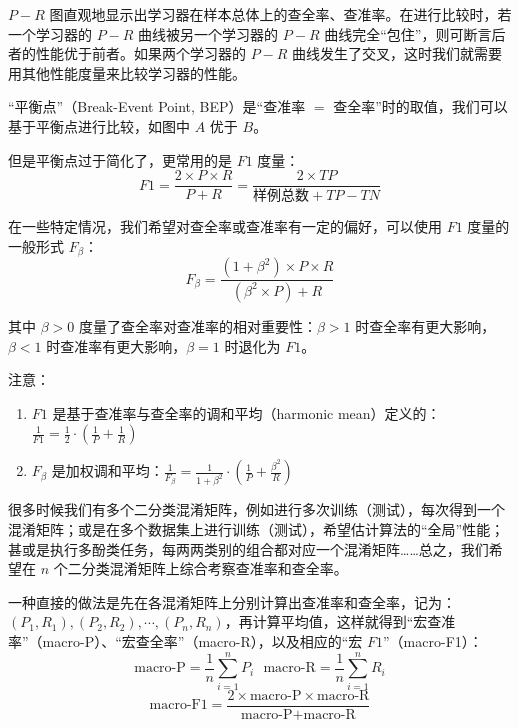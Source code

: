 \documentclass[12pt, a4paper]{article} %
\begin{document}
$P-R$ 图直观地显示出学习器在样本总体上的查全率、查准率。在进行比较时，若一个学习器的 $P-R$ 曲线被另一个学习器的 $P-R$ 曲线完全“包住”，则可断言后者的性能优于前者。如果两个学习器的 $P-R$ 曲线发生了交叉，这时我们就需要用其他性能度量来比较学习器的性能。

“平衡点”（Break-Event Point, BEP）是“查准率 $=$ 查全率”时的取值，我们可以基于平衡点进行比较，如图中 $A$ 优于 $B$。

但是平衡点过于简化了，更常用的是 $F1$ 度量：
\begin{equation*}
    F1 = \frac{2 \times P \times R}{P + R} = \frac{2 \times TP}{\text{样例总数} + TP - TN}
\end{equation*}

在一些特定情况，我们希望对查全率或查准率有一定的偏好，可以使用 $F1$ 度量的一般形式 $F_{\beta}$：
\begin{equation*}
    F_{\beta} = \frac{(1 + \beta^2) \times P \times R}{(\beta^2 \times P) + R}
\end{equation*}

其中 $\beta > 0$ 度量了查全率对查准率的相对重要性：$\beta > 1$ 时查全率有更大影响，$\beta < 1$ 时查准率有更大影响，$\beta = 1$ 时退化为 $F1$。

注意：
\begin{enumerate}[\hspace*{2em} i.]
    \item $F1$ 是基于查准率与查全率的调和平均（harmonic mean）定义的：$\displaystyle \frac{1}{F1} = \frac{1}{2} \cdot (\frac{1}{P} + \frac{1}{R})$
    \item $F_\beta$ 是加权调和平均：$\displaystyle \frac{1}{F_\beta} = \frac{1}{1 + \beta^2} \cdot (\frac{1}{P} + \frac{\beta^2}{R})$
\end{enumerate}

很多时候我们有多个二分类混淆矩阵，例如进行多次训练（测试），每次得到一个混淆矩阵；或是在多个数据集上进行训练（测试），希望估计算法的“全局”性能；甚或是执行多酚类任务，每两两类别的组合都对应一个混淆矩阵……总之，我们希望在 $n$ 个二分类混淆矩阵上综合考察查准率和查全率。

一种直接的做法是先在各混淆矩阵上分别计算出查准率和查全率，记为：$(P_1, R_1), (P_2, R_2), \cdots, (P_n, R_n)$，再计算平均值，这样就得到“宏查准率”（macro-P）、“宏查全率”（macro-R），以及相应的“宏 $F1$”（macro-F1）：
\begin{equation*}
    \text{macro-P} = \frac{1}{n} \sum_{i = 1}^{n} P_i \ \ \ \text{macro-R} = \frac{1}{n} \sum_{i = 1}^{n} R_i
\end{equation*}
\begin{equation*}
    \text{macro-F1} = \frac{2 \times \text{macro-P} \times \text{macro-R}}{\text{macro-P} + \text{macro-R}}
\end{equation*}
\end{document}
